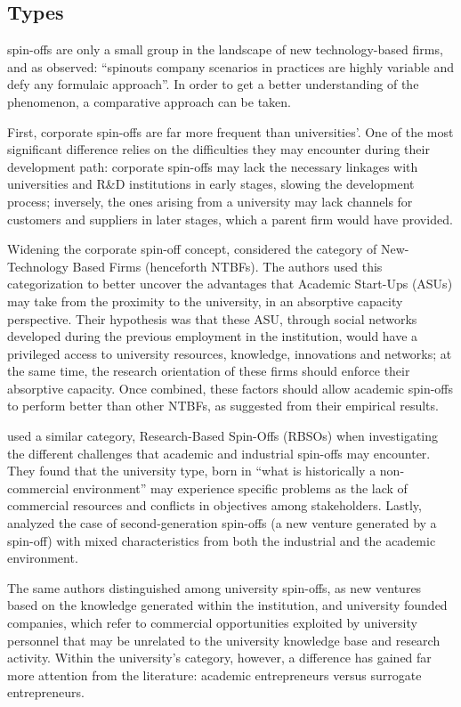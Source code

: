 \subsection{Types}

spin-offs are only a small group in the landscape of new technology-based firms, and as \citet{Franklin2001} observed: \enquote{spinouts company scenarios in practices are highly variable and defy any formulaic approach}. In order to get a better understanding of the phenomenon, a comparative approach can be taken.

First, corporate spin-offs are far more frequent than universities'. One of the most significant difference relies on the difficulties they may encounter during their development path: corporate spin-offs may lack the necessary linkages with universities and R\&D institutions in early stages, slowing the development process; inversely, the ones arising from a university may lack channels for customers and suppliers in later stages, which a parent firm would have provided.

Widening the corporate spin-off concept, \citet{Colombo2010} considered the category of New-Technology Based Firms (henceforth NTBFs). The authors used this categorization to better uncover the advantages that Academic Start-Ups (ASUs) may take from the proximity to the university, in an absorptive capacity perspective. Their hypothesis was that these ASU, through social networks developed during the previous employment in the institution, would have a privileged access to university resources, knowledge, innovations and networks; at the same time, the research orientation of these firms should enforce their absorptive capacity. Once combined, these factors should allow academic spin-offs to perform better than other NTBFs, as suggested from their empirical results.

\citet{Mustar2006} used a similar category, Research-Based Spin-Offs (RBSOs) when investigating the different challenges that academic and industrial spin-offs may encounter. They found that the university type, born in \enquote{what is historically a non-commercial environment} may experience specific problems as the lack of commercial resources and conflicts in objectives among stakeholders. Lastly, \citet{Leitch2005} analyzed the case of  second-generation spin-offs (a new venture generated by a spin-off) with mixed characteristics from both the industrial and the academic environment.

The same authors distinguished among university spin-offs, as new ventures based on the knowledge generated within the institution, and university founded companies, which refer to commercial opportunities exploited by university personnel that may be unrelated to the university knowledge base and research activity. Within the university's category, however, a difference has gained far more attention from the literature: academic entrepreneurs versus surrogate entrepreneurs.

